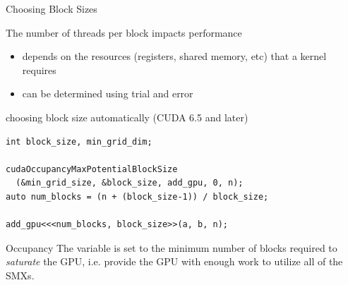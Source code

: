 \begin{frame}[fragile]{Choosing Block Sizes}
    \begin{info}{The number of threads per block impacts performance}
    \begin{itemize}
        \item depends on the resources (registers, shared memory, etc) that a kernel requires
        \item can be determined using trial and error
    \end{itemize}
    \end{info}

    \begin{code}{choosing block size automatically (CUDA 6.5 and later)}
        \begin{lstlisting}[style=boxcudatiny]
int block_size, min_grid_dim;

cudaOccupancyMaxPotentialBlockSize
  (&min_grid_size, &block_size, add_gpu, 0, n);
auto num_blocks = (n + (block_size-1)) / block_size;

add_gpu<<<num_blocks, block_size>>(a, b, n);
        \end{lstlisting}
    \end{code}

    \begin{info}{Occupancy}
    The variable  is set to the minimum number of blocks required to \emph{saturate} the GPU, i.e. provide the GPU with enough work to utilize all of the SMXs.
    \end{info}
\end{frame}


